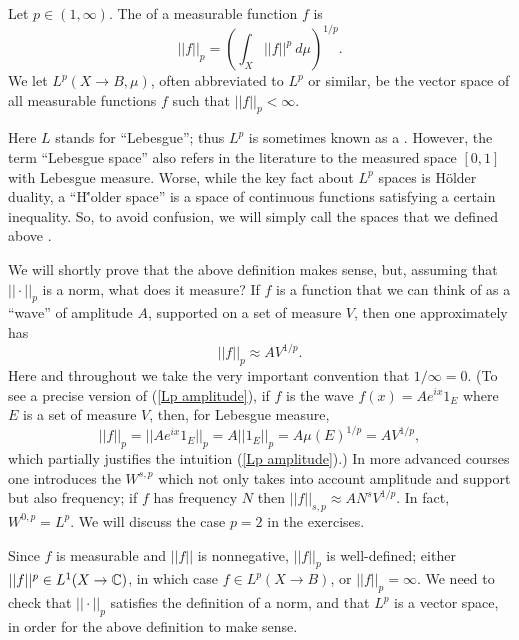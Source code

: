 \begin{definition}
Let $p \in (1, \infty)$.
The  of a measurable function $f$ is
\begin{equation}\label{Lp definition}
||f||_{p}  = {\left(\int_{X} ||f||^{p} ~d\mu\right)}^{1/p}.
\end{equation}
We let $L^{p}(X \to B, \mu)$, often abbreviated to $L^{p}$ or similar, be the vector space of all measurable functions $f$ such that $||f||_{p}  < \infty$.
\end{definition}

Here $L$ stands for ``Lebesgue''; thus $L^{p}$ is sometimes known as a .
However, the term ``Lebesgue space'' also refers in the literature to the measured space $[0, 1]$ with Lebesgue measure.
Worse, while the key fact about $L^{p}$ spaces is H\"older duality, a ``H\''older space'' is a space of continuous functions satisfying a certain inequality.
So, to avoid confusion, we will simply call the spaces that we defined above .

We will shortly prove that the above definition makes sense, but, assuming that $||\cdot||_{p} $ is a norm, what does it measure?
If $f$ is a function that we can think of as a ``wave'' of amplitude $A$, supported on a set of measure $V$, then one approximately has
\begin{equation}\label{Lp amplitude}
||f||_{p}  \approx AV^{1/p}.
\end{equation}
Here and throughout we take the very important convention that $1/\infty = 0$.
(To see a precise version of (\ref{Lp amplitude}), if $f$ is the wave $f(x) = Ae^{ix}1_{E}$ where $E$ is a set of measure $V$, then, for Lebesgue measure,
\[||f||_{p}  = ||Ae^{ix}1_{E}||_{p}  = A ||1_{E}||_{p}  = A\mu{(E)}^{1/p} = AV^{1/p},\]
which partially justifies the intuition (\ref{Lp amplitude}).)
In more advanced courses one introduces the  $W^{s,p}$ which not only takes into account amplitude and support but also frequency; if $f$ has frequency $N$ then $||f||_{s,p} \approx AN^{s}V^{1/p}$.
In fact, $W^{0,p} = L^{p}$.
We will discuss the case $p = 2$ in the exercises.

Since $f$ is measurable and $||f||$ is nonnegative, $||f||_{p} $ is well-defined; either $||f||^{p} \in L^{1}(X \to \mathbb{C})$, in which case $f \in L^{p}(X \to B)$, or $||f||_{p}  = \infty$.
We need to check that $||\cdot||_{p} $ satisfies the definition of a norm, and that $L^{p}$ is a vector space, in order for the above definition to make sense.

